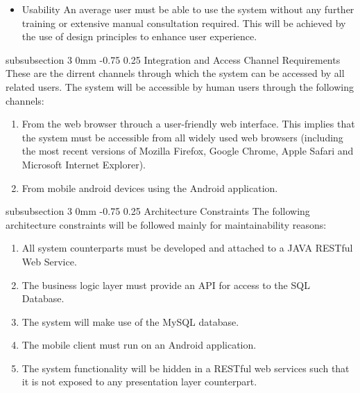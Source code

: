 \documentclass[12pt]{article}
\makeatletter
\renewcommand{\subsubsection}{\@startsection
   {subsubsection}%
   {3}%
   {0mm}%
   {-0.75\baselineskip}%
   {0.25\baselineskip}%
   {\rmfamily\normalfont\slshape\normalsize}}%
\makeatother
\begin{document}
\begin{itemize}
                							\item Usability
                									An average user must be able to use the system without any further training or extensive manual consultation required. This will be achieved by the use of design principles to enhance user experience.
		               								
                							
                					\end{itemize} 
                			 
                			\subsubsection{Integration and Access Channel Requirements}
                					These are the dirrent channels through which the system can be accessed by all related users.
	                				The system will be accessible by human users through the following channels:
	                				
			                    	\begin{enumerate}
					                    	\item From the web browser throuch a user-friendly web interface. This implies that the system must be accessible from all widely used web browsers (including the most recent versions of Mozilla Firefox, Google Chrome, Apple Safari and Microsoft Internet Explorer).
					                    	\item From mobile android devices using the Android application.
			                    	\end{enumerate}  
			                    	  
                			\subsubsection{Architecture Constraints}
                					The following architecture constraints will be followed mainly for maintainability reasons:
                					\begin{enumerate}
                							\item All system counterparts must be developed and attached to a JAVA RESTful Web Service.
                							\item The business logic layer must provide an API for access to the SQL Database.
                							\item The system will make use of the MySQL database.
                							\item The mobile client must run on an Android application.
                							\item The system functionality will be hidden in a RESTful web services such that it is not exposed to any presentation layer counterpart.
                					\end{enumerate}
                				
\end{document}
